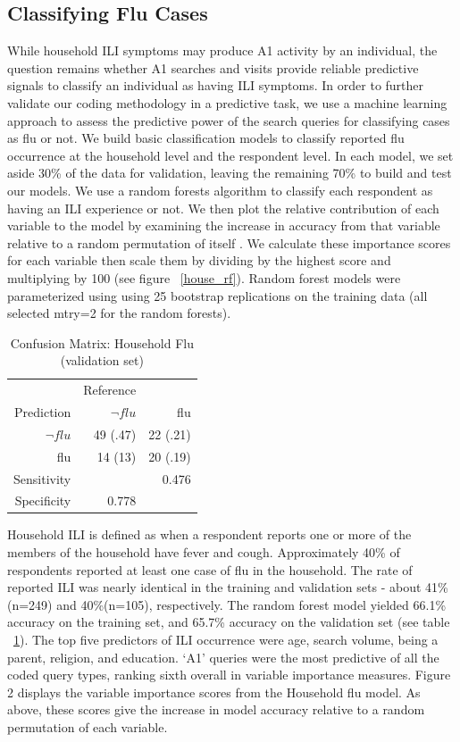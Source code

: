 \documentclass[12pt]{article}
\begin{document}
\subsection{Classifying Flu Cases}

While household ILI symptoms may produce A1 activity by an individual, the question remains whether A1 searches and visits provide reliable predictive signals to classify an individual as having ILI symptoms. In order to further validate our coding methodology in a predictive task, we use a machine learning approach to assess the predictive power of the search queries for classifying cases as flu or not. We build basic classification models to classify reported flu occurrence at the household level and the respondent level. In each model, we set aside 30\% of the data for validation, leaving the remaining 70\% to build and test our models. We use a random forests algorithm to classify each respondent as having an ILI experience or not. We then plot the relative contribution of each variable to the model by examining the increase in accuracy from that variable relative to a random permutation of itself \citet{breiman_2001random}. We calculate these importance scores for each variable then scale them by dividing by the highest score and multiplying by 100 \citep{kuhn_2008, kuhn_and_johnson_2013} (see figure ~\ref{house_rf}). Random forest models were parameterized using using 25 bootstrap replications on the training data (all selected mtry=2 for the random forests). 

\begin{table}[!htbp]
\centering
  \caption{Confusion Matrix: Household Flu (validation set)} 
  \label{classif1} 
\begin{tabular}{rrr}
  \hline
    & Reference &   \\
Prediction    &      $\neg{flu}$  &  flu\\
                $\neg{flu}$ & 49 (.47)  & 22 (.21)  \\
                          flu & 14 (13)  &  20 (.19) \\
   \hline
   Sensitivity &   &  0.476 \\
   Specificity & 0.778  &   \\
   \hline
\end{tabular}
\end{table}


Household ILI is defined as when a respondent reports one or more of the members of the household have fever and cough. Approximately 40\% of respondents reported at least one case of flu in the household. The rate of reported ILI was nearly identical in the training and validation sets - about 41\% (n=249) and 40\%(n=105), respectively. The random forest model yielded 66.1\% accuracy on the training set, and 65.7\% accuracy on the validation set (see table ~\ref{classif1}). The top five predictors of ILI occurrence were age, search volume, being a parent, religion, and education. `A1' queries were the most predictive of all the coded query types, ranking sixth overall in variable importance measures. Figure 2 displays the variable importance scores from the Household flu model. As above, these scores give the increase in model accuracy relative to a random permutation of each variable. 
\end{document}
